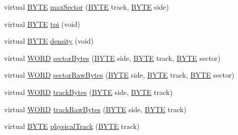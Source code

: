 \begin{DoxyCompactItemize}
\item 
virtual \hyperlink{hi__types_8h_aae9749d96e15ccb4f482dd5f55d98f9b}{B\+Y\+T\+E} \hyperlink{classHeathHSDisk_ab5f90b398c2a36cd2c02240d3f844fe4}{max\+Sector} (\hyperlink{hi__types_8h_aae9749d96e15ccb4f482dd5f55d98f9b}{B\+Y\+T\+E} track, \hyperlink{hi__types_8h_aae9749d96e15ccb4f482dd5f55d98f9b}{B\+Y\+T\+E} side)
\item 
virtual \hyperlink{hi__types_8h_aae9749d96e15ccb4f482dd5f55d98f9b}{B\+Y\+T\+E} \hyperlink{classHeathHSDisk_a4e239f96246529917c1dd93b60d827f1}{tpi} (void)
\item 
virtual \hyperlink{hi__types_8h_aae9749d96e15ccb4f482dd5f55d98f9b}{B\+Y\+T\+E} \hyperlink{classHeathHSDisk_a37b6a763a55b32cc7ea715ba0c607500}{density} (void)
\item 
virtual \hyperlink{hi__types_8h_ab24077addd3b7b13e086987ff296552c}{W\+O\+R\+D} \hyperlink{classHeathHSDisk_a6aa8ad6cc4087ac4f4255e24622686c9}{sector\+Bytes} (\hyperlink{hi__types_8h_aae9749d96e15ccb4f482dd5f55d98f9b}{B\+Y\+T\+E} side, \hyperlink{hi__types_8h_aae9749d96e15ccb4f482dd5f55d98f9b}{B\+Y\+T\+E} track, \hyperlink{hi__types_8h_aae9749d96e15ccb4f482dd5f55d98f9b}{B\+Y\+T\+E} sector)
\item 
virtual \hyperlink{hi__types_8h_ab24077addd3b7b13e086987ff296552c}{W\+O\+R\+D} \hyperlink{classHeathHSDisk_a42c16048e90d634b04732a8f9860b099}{sector\+Raw\+Bytes} (\hyperlink{hi__types_8h_aae9749d96e15ccb4f482dd5f55d98f9b}{B\+Y\+T\+E} side, \hyperlink{hi__types_8h_aae9749d96e15ccb4f482dd5f55d98f9b}{B\+Y\+T\+E} track, \hyperlink{hi__types_8h_aae9749d96e15ccb4f482dd5f55d98f9b}{B\+Y\+T\+E} sector)
\item 
virtual \hyperlink{hi__types_8h_ab24077addd3b7b13e086987ff296552c}{W\+O\+R\+D} \hyperlink{classHeathHSDisk_a9aed8f4c25789771be4319da95c935ef}{track\+Bytes} (\hyperlink{hi__types_8h_aae9749d96e15ccb4f482dd5f55d98f9b}{B\+Y\+T\+E} side, \hyperlink{hi__types_8h_aae9749d96e15ccb4f482dd5f55d98f9b}{B\+Y\+T\+E} track)
\item 
virtual \hyperlink{hi__types_8h_ab24077addd3b7b13e086987ff296552c}{W\+O\+R\+D} \hyperlink{classHeathHSDisk_aa7ac6b9c34da976352196b559aa42426}{track\+Raw\+Bytes} (\hyperlink{hi__types_8h_aae9749d96e15ccb4f482dd5f55d98f9b}{B\+Y\+T\+E} side, \hyperlink{hi__types_8h_aae9749d96e15ccb4f482dd5f55d98f9b}{B\+Y\+T\+E} track)
\item 
virtual \hyperlink{hi__types_8h_aae9749d96e15ccb4f482dd5f55d98f9b}{B\+Y\+T\+E} \hyperlink{classHeathHSDisk_a0fa1e73a54c10657388f4739631832fb}{physical\+Track} (\hyperlink{hi__types_8h_aae9749d96e15ccb4f482dd5f55d98f9b}{B\+Y\+T\+E} track)

\end{DoxyCompactItemize}
